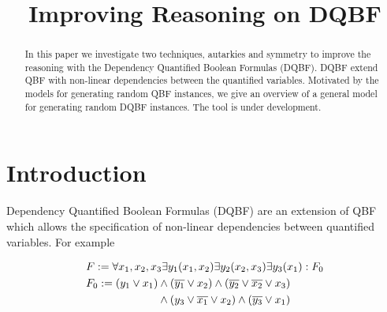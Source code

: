 \documentclass[conference]{IEEEtran}
\begin{document}
\title{Improving Reasoning on DQBF}


\author{
}

\maketitle

\begin{abstract}
In this paper we investigate two techniques, autarkies and symmetry to improve the reasoning with the Dependency Quantified Boolean Formulas (DQBF).
%
DQBF extend QBF with non-linear dependencies between the quantified variables.
%
Motivated by the models for generating random QBF instances, we give an overview of a general model for generating random DQBF instances.	
%
The tool is under development. 
%    
\end{abstract}



\section{Introduction}
\label{sec:Intro}
Dependency Quantified Boolean Formulas (DQBF) are an extension of QBF
which allows the specification of non-linear dependencies between quantified variables. 
%
%
For example \par\noindent
%
\begin{equation}
\begin{split}
&F := \forall x_1,x_2,x_3 \exists y_1(x_1,x_2) \exists y_2(x_2,x_3) \exists y_3(x_1): F_0 \\
&F_0 := (y_1 \vee x_1) \wedge (\overline{y_1} \vee x_2) \wedge (\overline{y_2} \vee \overline{x_2} \vee x_3) \\
&\hspace{2.3cm}\wedge (y_3 \vee \overline{x_1} \vee x_2) \wedge (\overline{y_3} \vee x_1)
\end{split}
\label{eqn:ex}
\end{equation}
\end{document}
